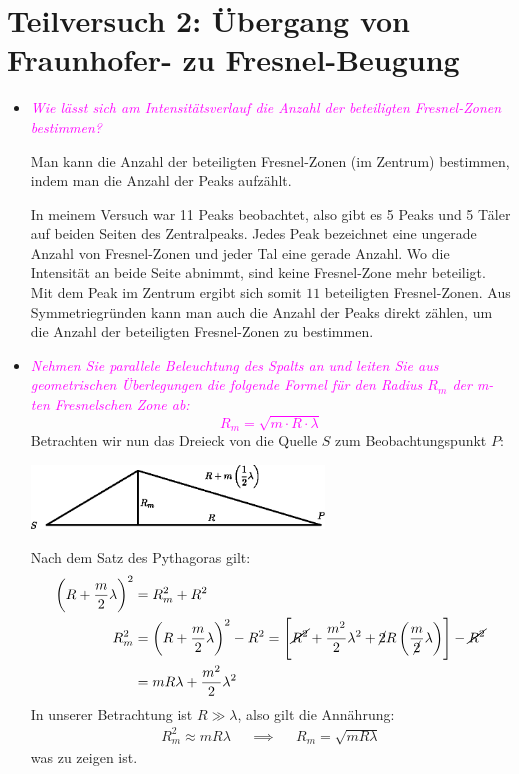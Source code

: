 \newcommand{\question}[1]{\textit{\textcolor{Magenta}{#1}}}

\section{Teilversuch 2: Übergang von Fraunhofer- zu Fresnel-Beugung}
	\begin{itemize}
		\item \question{Wie lässt sich am Intensitätsverlauf die Anzahl der beteiligten Fresnel-Zonen bestimmen?}

			Man kann die Anzahl der beteiligten Fresnel-Zonen (im Zentrum) bestimmen, indem man die Anzahl der Peaks aufzählt. 

			In meinem Versuch war 11 Peaks beobachtet, also gibt es 5 Peaks und 5 Täler auf beiden Seiten des Zentralpeaks. Jedes Peak bezeichnet eine ungerade Anzahl von Fresnel-Zonen und jeder Tal eine gerade Anzahl. Wo die Intensität an beide Seite abnimmt, sind keine Fresnel-Zone mehr beteiligt. Mit dem Peak im Zentrum ergibt sich somit $11$ beteiligten Fresnel-Zonen. Aus Symmetriegründen kann man auch die Anzahl der Peaks direkt zählen, um die Anzahl der beteiligten Fresnel-Zonen zu bestimmen. 
		\item \question{Nehmen Sie parallele Beleuchtung des Spalts an und leiten Sie aus geometrischen Überlegungen die folgende Formel für den Radius $R_m$ der m-ten Fresnelschen Zone ab:
			\begin{equation}
				R_m = \sqrt{m \cdot R\cdot \lambda}
			\end{equation}
			}
			Betrachten wir nun das Dreieck von die Quelle $S$ zum Beobachtungspunkt $P$:
			\begin{center}
				\vspace{1em}
				\includegraphics[height=1.7cm]{images/fresnel-radius.eps}
			\end{center}
			Nach dem Satz des Pythagoras gilt:
			\begin{align}
				\left(R+\frac{m}{2}\lambda\right)^2 &= R_m^2 + R^2 \\
				R_m^2 &= \left(R+\frac{m}{2}\lambda\right)^2 - R^2 = \left[\cancel{R^2} + \frac{m^2}{2}\lambda^2 + \cancel{2}R\left(\frac{m}{\cancel{2}}\lambda\right)\right] - \cancel{R^2} \notag \\
				&= mR\lambda + \frac{m^2}{2}\lambda^2
			\end{align}
			In unserer Betrachtung ist $R \gg \lambda$, also gilt die Annährung:
			\begin{align}
				R_m^2 \approx mR\lambda &&\implies&& R_m = \sqrt{mR\lambda}
			\end{align}
			was zu zeigen ist. 


\end{itemize}
